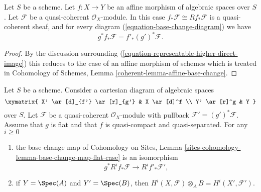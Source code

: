 \begin{lemma}
\label{lemma-affine-base-change}
Let $S$ be a scheme. Let $f : X \to Y$ be an affine morphism of algebraic
spaces over $S$. Let $\mathcal{F}$ be a quasi-coherent $\mathcal{O}_X$-module.
In this case $f_*\mathcal{F} \cong Rf_*\mathcal{F}$ is a quasi-coherent
sheaf, and for every diagram (\ref{equation-base-change-diagram})
we have
$$
g^*f_*\mathcal{F} = f'_*(g')^*\mathcal{F}.
$$
\end{lemma}

\begin{proof}
By the discussion surrounding
(\ref{equation-representable-higher-direct-image})
this reduces to the case of an affine morphism of schemes which
is treated in Cohomology of Schemes, Lemma
\ref{coherent-lemma-affine-base-change}.
\end{proof}

\begin{lemma}
\label{lemma-flat-base-change-cohomology}
Let $S$ be a scheme. Consider a cartesian diagram of algebraic spaces
$$
\xymatrix{
X' \ar[d]_{f'} \ar[r]_{g'} & X \ar[d]^f \\
Y' \ar[r]^g & Y
}
$$
over $S$.
Let $\mathcal{F}$ be a quasi-coherent $\mathcal{O}_X$-module
with pullback $\mathcal{F}' = (g')^*\mathcal{F}$.
Assume that $g$ is flat and that $f$ is quasi-compact and quasi-separated.
For any $i \geq 0$
\begin{enumerate}
\item the base change map of
Cohomology on Sites, Lemma
\ref{sites-cohomology-lemma-base-change-map-flat-case}
is an isomorphism
$$
g^*R^if_*\mathcal{F} \longrightarrow R^if'_*\mathcal{F}',
$$
\item if $Y = \Spec(A)$ and $Y' = \Spec(B)$, then
$H^i(X, \mathcal{F}) \otimes_A B = H^i(X', \mathcal{F}')$.
\end{enumerate}
\end{lemma}

